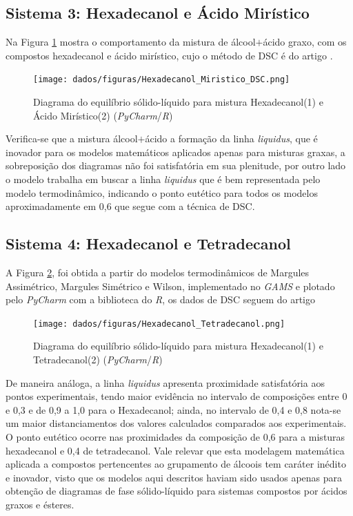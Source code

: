 \subsection{Sistema 3: Hexadecanol e Ácido Mirístico}\label{sistema4}

Na Figura \ref{fig:5} mostra o comportamento da mistura de álcool$+$ácido graxo, com os compostos hexadecanol e ácido mirístico, cujo o método de DSC é do artigo \cite{Mailhe2020}.
\begin{figure}[H]
	\centering
	\texttt{[image: dados/figuras/Hexadecanol\_Miristico\_DSC.png]}
	\caption[Diagrama do equilíbrio sólido-líquido para mistura Hexadecanol e Ácido Mirístico]{Diagrama do equilíbrio sólido-líquido para mistura Hexadecanol(1) e Ácido Mirístico(2) (\textit{PyCharm}/\textit{R})}
	\label{fig:5}
\end{figure}

Verifica-se que a mistura álcool$+$ácido a formação da linha \textit{liquidus}, que é inovador para os modelos matemáticos aplicados apenas para misturas graxas, a sobreposição dos diagramas não foi satisfatória em sua plenitude, por outro lado o modelo trabalha em buscar a linha \textit{liquidus} que é bem representada pelo modelo termodinâmico, indicando o ponto eutético para todos os modelos aproximadamente em 0,6 que segue com a técnica de DSC.

\subsection{Sistema 4: Hexadecanol e Tetradecanol}\label{sistema5}
A Figura \ref{fig:2}, foi obtida a partir do modelos termodinâmicos de Margules Assimétrico, Margules Simétrico e Wilson, implementado no \textit{GAMS} e plotado pelo \textit{PyCharm} com a biblioteca do \textit{R}, os dados de DSC seguem do artigo \cite{Maximo2014}

\begin{figure}[H]
	\centering
	\texttt{[image: dados/figuras/Hexadecanol\_Tetradecanol.png]}
	\caption[Diagrama do equilíbrio sólido-líquido para mistura Hexadecanol e Tetradecanol]{Diagrama do equilíbrio sólido-líquido para mistura Hexadecanol(1) e Tetradecanol(2) (\textit{PyCharm}/\textit{R})}
	\label{fig:2}
\end{figure}

De maneira análoga, a linha \textit{liquidus} apresenta proximidade satisfatória aos pontos experimentais, tendo maior evidência no intervalo de composições entre 0 e 0,3 e de 0,9 a 1,0 para o Hexadecanol; ainda, no intervalo de 0,4 e 0,8  nota-se um maior distanciamentos dos valores calculados comparados aos experimentais. O ponto eutético ocorre nas proximidades da composição de 0,6 para a misturas hexadecanol e 0,4 de tetradecanol. Vale relevar que esta modelagem matemática aplicada a compostos pertencentes ao grupamento de álcoois tem caráter inédito e inovador, visto que os modelos aqui descritos haviam sido usados apenas para obtenção de diagramas de fase sólido-líquido para sistemas compostos por ácidos graxos e ésteres.

